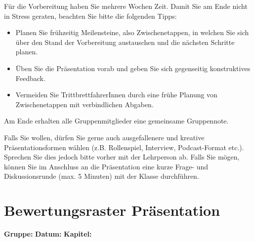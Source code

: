 \begin{myattention} Für die Vorbereitung haben Sie mehrere Wochen Zeit. Damit Sie am Ende nicht in Stress geraten, beachten Sie bitte die folgenden Tipps:
\begin{itemize}
	\item Planen Sie frühzeitig Meilensteine, also Zwischenetappen, in welchen Sie sich über den Stand der Vorbereitung austauschen und die nächsten Schritte planen.
	\item Üben Sie die Präsentation vorab und geben Sie sich gegenseitig konstruktives Feedback.
	\item Vermeiden Sie TrittbrettfahrerInnen durch eine frühe Planung von Zwischenetappen mit verbindlichen Abgaben.
\end{itemize}

Am Ende erhalten alle Gruppenmitglieder eine gemeinsame Gruppennote.
\end{myattention}

Falls Sie wollen, dürfen Sie gerne auch ausgefallenere und kreative Präsentationsformen wählen (z.B. Rollenspiel, Interview, Podcast-Format etc.). Sprechen Sie dies jedoch bitte vorher mit der Lehrperson ab. Falls Sie mögen, können Sie im Anschluss an die Präsentation eine kurze Frage- und Diskussionsrunde (max. 5 Minuten) mit der Klasse durchführen.

\newpage
\restoregeometry
\pagestyle{empty}

\section*{Bewertungsraster Präsentation}

\footnotesize
\vspace{0.3cm}

\noindent
\newcommand{\headFld}[2]{\TextField[name=#1, width=#2, height=.35cm, borderwidth=0]{} }
\textbf{Gruppe:} \headFld{gruppe}{5.4cm} \quad \textbf{Datum:} \headFld{datum}{3.8cm} \quad \textbf{Kapitel:} \headFld{kapitel}{5.4cm}

\vspace{0.3cm}
\newcommand{\commentFld}[1]{\TextField[value={Kommentar:}, name=#1, width=15.5cm, height=1.9cm, borderwidth=0, charsize=5pt, multiline=true, maxlen=1000]{}}
\newcommand{\ptFld}[1]{\TextField[name=#1, width=1cm, height=.3cm, borderwidth=0]{}}

